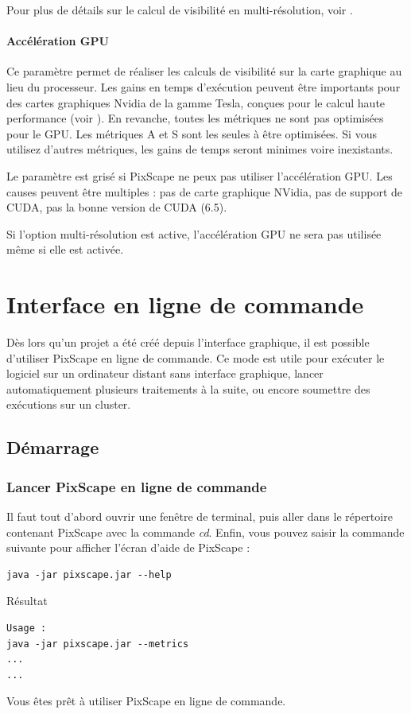 \documentclass{report}
\begin{document}
Pour plus de détails sur le calcul de visibilité en multi-résolution, voir .


\subsubsection{Accélération GPU}
Ce paramètre permet de réaliser les calculs de visibilité sur la carte graphique au lieu du processeur. Les gains en temps d'exécution peuvent être importants pour des cartes graphiques Nvidia de la gamme Tesla, conçues pour le calcul haute performance (voir ). En revanche, toutes les métriques ne sont pas optimisées pour le GPU. Les métriques A et S sont les seules à être optimisées. Si vous utilisez d'autres métriques, les gains de temps seront minimes voire inexistants.

Le paramètre est grisé si PixScape ne peux pas utiliser l'accélération GPU. Les causes peuvent être multiples : pas de carte graphique NVidia, pas de support de CUDA, pas la bonne version de CUDA (6.5).

Si l'option multi-résolution est active, l'accélération GPU ne sera pas utilisée même si elle est activée.


\chapter{Interface en ligne de commande}
\label{cli}

Dès lors qu'un projet a été créé depuis l'interface graphique, il est possible d'utiliser PixScape en ligne de commande. Ce mode est utile pour exécuter le logiciel sur un ordinateur distant sans interface graphique, lancer automatiquement plusieurs traitements à la suite, ou encore soumettre des exécutions sur un cluster.

\section{Démarrage}

\subsection{Lancer PixScape en ligne de commande}
Il faut tout d'abord ouvrir une fenêtre de terminal, puis aller dans le répertoire contenant PixScape avec la commande \textit{cd}.
Enfin, vous pouvez saisir la commande suivante pour afficher l'écran d'aide de PixScape :
\begin{Verbatim}
java -jar pixscape.jar --help
\end{Verbatim}
Résultat
\begin{Verbatim}
Usage :
java -jar pixscape.jar --metrics
...
...
\end{Verbatim}
Vous êtes prêt à utiliser PixScape en ligne de commande.
\end{document}
